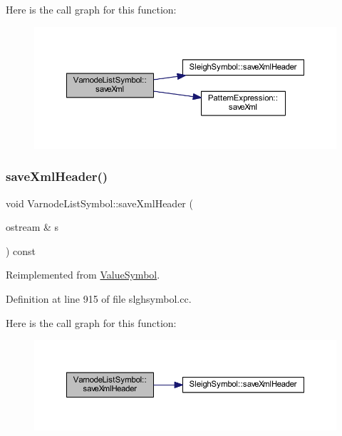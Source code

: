Here is the call graph for this function\+:
\nopagebreak
\begin{figure}[H]
\begin{center}
\leavevmode
\includegraphics[width=350pt]{class_varnode_list_symbol_a4b95e5f5b2c0ebd4a0eee076c9ed96de_cgraph}
\end{center}
\end{figure}
\mbox{\label{class_varnode_list_symbol_ab94e4dd41289435b00157190e6ba6a71}} 
\subsubsection{\texorpdfstring{saveXmlHeader()}{saveXmlHeader()}}
{\footnotesize\ttfamily void Varnode\+List\+Symbol\+::save\+Xml\+Header (\begin{DoxyParamCaption}\item[{ostream \&}]{s }\end{DoxyParamCaption}) const\hspace{0.3cm}{\ttfamily [virtual]}}



Reimplemented from \mbox{\hyperlink{class_value_symbol_a7b1c84bd9d7e84f9272d448d10c31200}{Value\+Symbol}}.



Definition at line 915 of file slghsymbol.\+cc.

Here is the call graph for this function\+:
\nopagebreak
\begin{figure}[H]
\begin{center}
\leavevmode
\includegraphics[width=350pt]{class_varnode_list_symbol_ab94e4dd41289435b00157190e6ba6a71_cgraph}
\end{center}
\end{figure}


